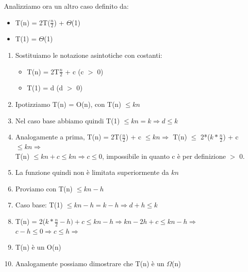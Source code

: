 \documentclass{report}
\newcommand{\T}[1]{$\Theta$(#1)}
\begin{document}
            Analizziamo ora un altro caso definito da:
            \begin{itemize}
                \item T(n) = 2T($\frac{n}{2}$) + \T{1}
                \item T(1) = \T{1}
            \end{itemize}
            \begin{enumerate}
                \item Sostituiamo le notazione asintotiche con costanti:
                \begin{itemize}
                    \item T(n) = 2T{$\frac{n}{2}$} + c (c $>$ 0)
                    \item T(1) = d (d $>$ 0)
                \end{itemize}
                \item Ipotizziamo T(n) = O(n), con T(n) $\leq kn$ 
                \item Nel caso base abbiamo quindi T(1) $\leq kn = k \Longrightarrow d \leq k$
                \item Analogamente a prima, T(n) = 2T($\frac{n}{2}$) + c $\leq kn \Longrightarrow$
                    T(n) $\leq$ 2*($k*\frac{n}{2}$) + c $\leq kn \Longrightarrow$ \\
                    T(n) $\leq kn + c \leq kn \Longrightarrow c \leq 0$, impossibile in quanto
                    c è per definizione $>$ 0. 
                \item La funzione quindi non è limitata superiormente da $kn$
                \item Proviamo con T(n) $\leq kn - h$
                \item Caso base: T(1) $\leq kn - h = k - h \Longrightarrow d + h \leq k$
                \item T(n) = 2($k*\frac{n}{2} - h) + c \leq kn - h \Longrightarrow kn - 2h + c \leq kn - h 
                    \Longrightarrow$ \\ $c - h \leq 0 \Longrightarrow c \leq h \Longrightarrow$
                \item T(n) è un O(n)
                \item Analogamente possiamo dimostrare che T(n) è un $\Omega$(n)
            \end{enumerate}
\end{document}
